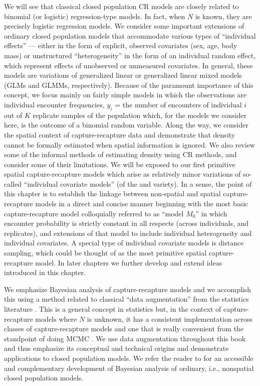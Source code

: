 We will
see that classical closed population CR models are closely related to binomial (or logistic)
regression-type models. In fact, when $N$ is known, they are precisely
logistic regression models.  We consider some important extensions of ordinary closed
population models that accommodate various types of ``individual
effects'' --- either in the form of explicit, observed %
covariates (sex, age,
body mass) or unstructured ``heterogeneity'' in the form of an
individual random effect, which represent effects of unobserved or
unmeasured covariates. In general, these models are variations of
generalized linear or generalized linear mixed models (GLMs and GLMMs, respectively).
Because of the paramount importance of this concept, we focus mainly
on fairly simple models in which the observations are individual
encounter frequencies, $y_{i}$ = the number of encounters of
individual $i$ out of $K$ replicate samples of the population which,
for the models we consider here, is the outcome of a binomial random
variable.  Along the way, we consider the spatial context of
capture-recapture data %
and demonstrate that density cannot
be formally estimated when spatial information is ignored. We also
review some of the informal methods of estimating density using CR
methods, and consider some of their limitations.  We will be exposed
to our first primitive spatial capture-recapture models which arise as
relatively minor variations of so-called ``individual covariate
models'' (of the \citet{huggins:1989} and \citet{alho:1990}
variety). In a sense, the point of this chapter is to establish the %
linkage  between non-spatial and spatial capture-recapture models
 in a direct and concise manner beginning with the most basic
 capture-recapture model colloquially referred to as ``model $M_0$''
 \citep{otis_etal:1978} in which encounter probability is strictly
 constant in all respects (across individuals, and replicates), and
 extensions of that model to include individual
heterogeneity and individual covariates. A special type of
individual covariate models is distance sampling, which could be
thought of as the most primitive spatial capture-recapture model. In
later chapters we further develop and extend ideas introduced in this
chapter.

We emphasize Bayesian analysis of capture-recapture models and we
accomplish this using a method related to classical ``data
augmentation'' from the statistics literature
\citep[e.g.,][]{tanner_wong:1987}.  This is a general concept in
statistics but, in the context of capture-recapture models where $N$
is unknown, it has a consistent implementation across classes of
capture-recapture models and one that is really convenient from the
standpoint of doing MCMC \citep{royle_etal:2007,royle_dorazio:2011}. We use data
augmentation throughout this book and thus emphasize its conceptual
and technical origins and demonstrate applications to closed
population models.  We refer the reader to
\citet[][ch. 6]{kery_schaub:2011} for an accessible and complementary
development of Bayesian analysis of ordinary, i.e., nonspatial closed population models.


